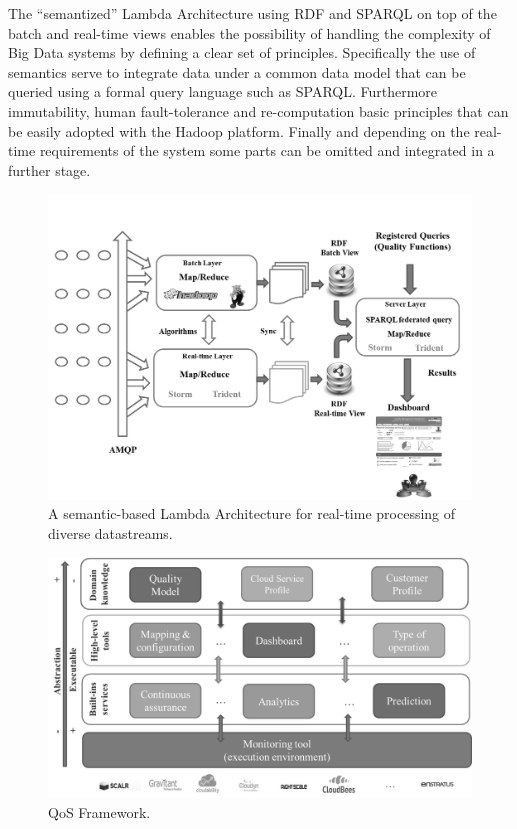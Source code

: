 The ``semantized'' Lambda Architecture using RDF and SPARQL on top of the batch and real-time views enables 
the possibility of handling the complexity of Big Data systems by defining a clear set of principles. Specifically 
the use of semantics serve to integrate data under a common data model that can be queried using a formal 
query language such as SPARQL. Furthermore immutability, human fault-tolerance and re-computation basic principles 
that can be easily adopted with the Hadoop platform. Finally and depending on the real-time requirements of 
the system some parts can be omitted and integrated in a further stage.

\begin{figure}[!ht]
\centering
	\includegraphics[width=12cm]{./imgs/lambda-qos}
 \caption{A semantic-based Lambda Architecture for real-time processing of diverse datastreams.}
 \label{fig:lambda-qos}
\end{figure}




\begin{figure}[!ht]
\centering
	\includegraphics[width=12cm]{./imgs/qos-framework}
 \caption{QoS Framework.}
 \label{fig:qos-framework}
\end{figure}



